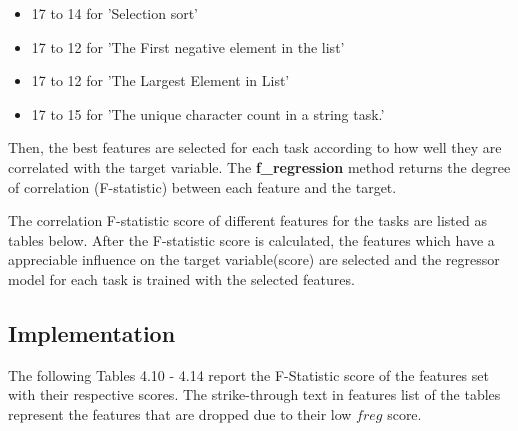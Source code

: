 \begin{itemize}
    \item 17 to 14 for 'Selection sort'
    \item 17 to 12 for 'The First negative element in the list'
    \item 17 to 12 for 'The Largest Element in List'
    \item 17 to 15 for 'The unique character count in a string task.'
\end{itemize}

Then, the best features are selected for each task according to how well they are correlated with the target variable. The \textbf{f\_regression} method \cite{H} returns the degree of correlation (F-statistic) between each feature and the target. 

The correlation F-statistic score of different features for the tasks are listed as tables below. After the F-statistic score is calculated, the features which have a appreciable influence on the target variable(score) are selected and the regressor model for each task is trained with the selected features.

\subsection{Implementation}

The following Tables 4.10 - 4.14 report the F-Statistic score of the features set with their respective scores. The strike-through text in features list of the tables represent the features that are dropped due to their low $f{reg}$ score.


